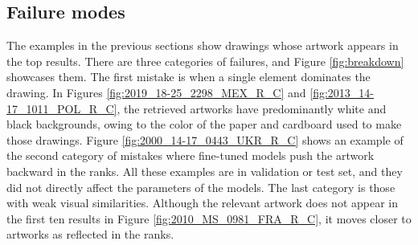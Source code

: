 \subsection{Failure modes}

The examples in the previous sections show drawings whose artwork appears in the top results. There are three categories of failures, and Figure \ref{fig:breakdown} showcases them. The first mistake is when a single element dominates the drawing. In Figures \ref{fig:2019_18-25_2298_MEX_R_C} and \ref{fig:2013_14-17_1011_POL_R_C}, the retrieved artworks have predominantly white and black backgrounds, owing to the color of the paper and cardboard used to make those drawings. Figure \ref{fig:2000_14-17_0443_UKR_R_C} shows an example of the second category of mistakes where fine-tuned models push the artwork backward in the ranks. All these examples are in validation or test set, and they did not directly affect the parameters of the models. The last category is those with weak visual similarities. Although the relevant artwork does not appear in the first ten results in Figure \ref{fig:2010_MS_0981_FRA_R_C}, it moves closer to artworks as reflected in the ranks.

